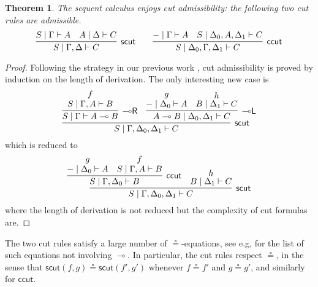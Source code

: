 \documentclass[copyright,creativecommons]{eptcs}
\newtheorem{theorem}{Theorem}[section]
\theoremstyle{definition}
\newcommand{\lright}{{\multimap}\mathsf{R}}
\newcommand{\lleft}{{\multimap}\mathsf{L}}
\newcommand{\lolli}{\multimap}
\begin{document}
\begin{theorem}
The sequent calculus enjoys cut admissibility: the following two cut rules are admissible.
  \begin{displaymath}
    \infer[\mathsf{scut}]{S \mid \Gamma , \Delta \vdash C}{
      S \mid \Gamma \vdash A
      &
      A \mid \Delta \vdash C
    }
    \qquad
    \infer[\mathsf{ccut}]{S \mid \Delta_0 , \Gamma , \Delta_1 \vdash C}{
      {-} \mid \Gamma \vdash A
      &
      S \mid \Delta_0 , A , \Delta_1 \vdash C
    }
  \end{displaymath}
\end{theorem}
\begin{proof}
  Following the strategy in our previous work \cite{uustalu:sequent:2021}, cut admissibility is proved by induction on the length of derivation.
  The only interesting new case is 
  \begin{displaymath}
    \infer[\mathsf{scut}]{S \mid \Gamma , \Delta_0 , \Delta_1 \vdash C}{
      \infer[\lright]{S \mid \Gamma \vdash A \lolli B}{
        \deduce{S \mid \Gamma , A \vdash B}{f}
      }
      &
      \infer[\lleft]{A \lolli B \mid \Delta_0 , \Delta_1 \vdash C}{
        \deduce{{-} \mid \Delta_0 \vdash A}{g}
        &
        \deduce{B \mid \Delta_1 \vdash C}{h}
      }
    }
  \end{displaymath}
   which is reduced to 
  \begin{displaymath}
    \infer[\mathsf{scut}]{S \mid \Gamma , \Delta_0 , \Delta_1 \vdash C}{
      \infer[\mathsf{ccut}]{S \mid \Gamma , \Delta_0 \vdash B}{
        \deduce{{-} \mid \Delta_0 \vdash A}{g}
        &
        \deduce{S \mid \Gamma , A \vdash B}{f}
      }
      &
      \deduce{B \mid \Delta_1 \vdash C}{h}
    }
  \end{displaymath}
  where the length of derivation is not reduced but the complexity of cut formulas are.
\end{proof}
The two cut rules satisfy a large number of
$\circeq$-equations, see e.g, \cite[Figures 5 and 6]{uustalu:sequent:2021} for the
list of such equations not involving $\lolli$.
In particular, the cut rules respect $\circeq$, in the sense that $\mathsf{scut}(f,g) \circeq \mathsf{scut}(f',g')$ whenever $f \circeq f'$ and $g \circeq g'$, and similarly for $\mathsf{ccut}$.
\end{document}
